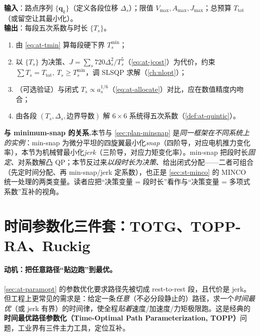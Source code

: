 \begin{algo}\label{alg:at-paramopt}
\textbf{输入}：路点序列 $\{\mathbf{q}_k\}$（定义各段位移 $\Delta_s$）；限值 $V_{\max},A_{\max},J_{\max}$；总预算 $T_{\mathrm{tot}}$（或留空让其最小化）。\\
\textbf{输出}：每段五次系数与时长 $\{T_s\}$。
\begin{enumerate}
  \item 由 \cref{eq:at-tmin} 算每段硬下界 $T_s^{\min}$；
  \item 以 $\{T_s\}$ 为决策、$J=\sum_s 720\Delta_s^2/T_s^5$（\cref{eq:at-jcost}）为代价，约束 $\sum T_s=T_{\mathrm{tot}},\ T_s\ge T_s^{\min}$，调 SLSQP 求解（\cref{ch:nlopt}）；
  \item （可选验证）与闭式 $T_s\propto a_s^{1/6}$（\cref{eq:at-allocate}）对比，应在数值精度内吻合；
  \item 由各段 $(T_s,\Delta_s,\text{边界导数})$ 解 $6\times 6$ 系统得五次系数（\cref{def:at-quintic}）。
\end{enumerate}
\end{algo}

\begin{note}
\textbf{与 minimum-snap 的关系.}\;本节与 \cref{sec:plan-minsnap} 是\emph{同一框架在不同系统上的实例}：min-snap 为微分平坦的四旋翼最小化\emph{snap}（四阶导，对应电机推力变化率），本节为机械臂最小化\emph{jerk}（三阶导，对应力矩变化率）。min-snap 把段时长\emph{固定}、对系数解凸 QP；本节反过来\emph{以段时长为决策}、给出闭式分配——二者可组合（先定时间分配、再 min-snap/jerk 定系数），也正是 \cref{sec:st-minco} 的 MINCO 统一处理的两类变量。读者应把“决策变量 = 段时长”看作与“决策变量 = 多项式系数”互补的视角。
\end{note}

\section{时间参数化三件套：TOTG、TOPP-RA、Ruckig}
\label{sec:at-timeparam}

\paragraph{动机：把任意路径“贴边跑”到最优。}
\cref{sec:at-paramopt} 的参数优化要求路径先被切成 rest-to-rest 段，且代价是 jerk。但工程上更常见的需求是：给定一条\emph{任意}（不必分段静止的）路径，求一个\emph{时间最优}（或 jerk 有界）的时间律，使全程\emph{贴着}速度/加速度/力矩极限跑。这是经典的\textbf{时间最优路径参数化（Time-Optimal Path Parameterization, TOPP）}问题，工业界有三件主力工具，定位互补。


